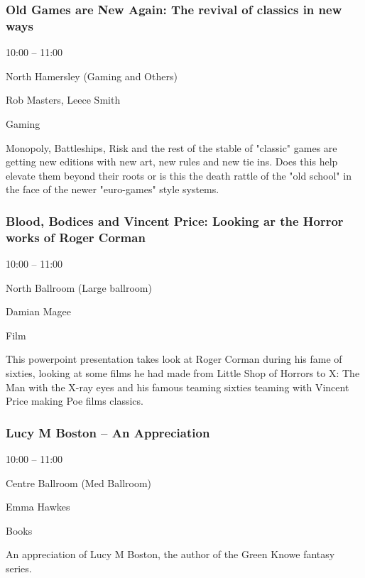 \documentclass{scrreprt}
\begin{document}
\begin{multicols}{2}
\subsubsection*{Old Games are New Again: The revival of classics in new ways}\begin{description}
\setlength{\itemsep}{0pt}
\setlength{\parsep}{0pt}
\setlength{\parskip}{0pt}
\item[Time:]{10:00 -- 11:00}
\item[Venue:]{North Hamersley (Gaming and Others)}
\item[People:]{Rob Masters, Leece Smith}
\item[Tags:]{Gaming}\end{description}
Monopoly, Battleships, Risk and the rest of the stable of "classic" games are getting new editions with new art, new rules and new tie ins. Does this help elevate them beyond their roots or is this the death rattle of the "old school" in the face of the newer "euro-games" style systems.
\subsubsection*{Blood, Bodices and Vincent Price: Looking ar the Horror works of Roger Corman}\begin{description}
\setlength{\itemsep}{0pt}
\setlength{\parsep}{0pt}
\setlength{\parskip}{0pt}
\item[Time:]{10:00 -- 11:00}
\item[Venue:]{North Ballroom (Large ballroom)}
\item[People:]{Damian Magee}
\item[Tags:]{Film}\end{description}
This powerpoint presentation takes look at Roger Corman during his fame of sixties, looking at some films he had made from Little Shop of Horrors to X: The Man with the X-ray eyes and his famous teaming sixties teaming with Vincent Price making Poe films classics.
\subsubsection*{Lucy M Boston – An Appreciation}\begin{description}
\setlength{\itemsep}{0pt}
\setlength{\parsep}{0pt}
\setlength{\parskip}{0pt}
\item[Time:]{10:00 -- 11:00}
\item[Venue:]{Centre Ballroom (Med Ballroom)}
\item[People:]{Emma Hawkes}
\item[Tags:]{Books}\end{description}
An appreciation of Lucy M Boston, the author of the Green Knowe fantasy series.

\end{multicols}
\end{document}
